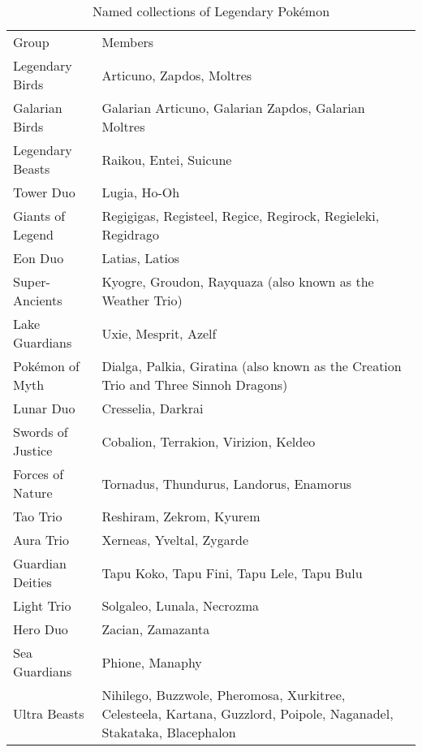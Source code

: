 \begin{table}
\begin{tabular}{lp{}}
Group & Members\\
\Midrule
Legendary Birds & Articuno, Zapdos, Moltres\\
Galarian Birds & Galarian Articuno, Galarian Zapdos, Galarian Moltres\\
Legendary Beasts & Raikou, Entei, Suicune\\
Tower Duo & Lugia, Ho-Oh\\
Giants of Legend & Regigigas, Registeel, Regice, Regirock, Regieleki, Regidrago\\
Eon Duo & Latias, Latios\\
Super-Ancients & Kyogre, Groudon, Rayquaza (also known as the Weather Trio)\\
Lake Guardians & Uxie, Mesprit, Azelf\\
Pokémon of Myth & Dialga, Palkia, Giratina (also known as the Creation Trio and Three Sinnoh Dragons)\\
Lunar Duo & Cresselia, Darkrai\\
Swords of Justice & Cobalion, Terrakion, Virizion, Keldeo\\
Forces of Nature & Tornadus, Thundurus, Landorus, Enamorus\\
Tao Trio & Reshiram, Zekrom, Kyurem\\
Aura Trio & Xerneas, Yveltal, Zygarde\\
Guardian Deities & Tapu Koko, Tapu Fini, Tapu Lele, Tapu Bulu\\
Light Trio & Solgaleo, Lunala, Necrozma\\
Hero Duo & Zacian, Zamazanta\\
Sea Guardians & Phione, Manaphy\\
Ultra Beasts & Nihilego, Buzzwole, Pheromosa, Xurkitree, Celesteela, Kartana, Guzzlord,
               Poipole, Naganadel, Stakataka, Blacephalon \\
\end{tabular}
\caption{Named collections of Legendary Pokémon\label{table:namedmyths}}
\end{table}

%
